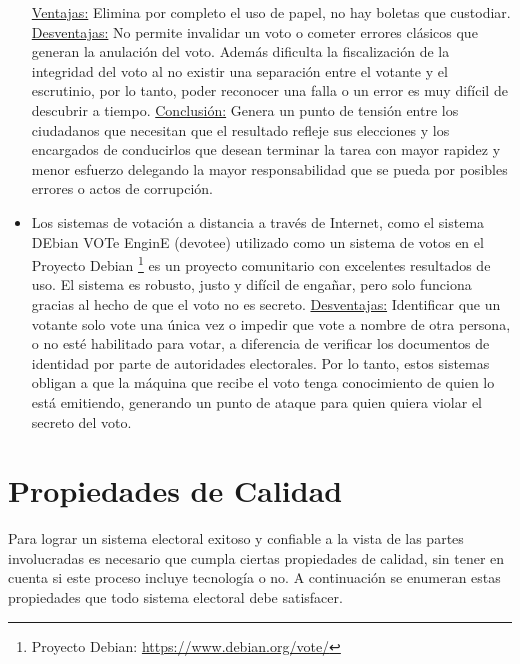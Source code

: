 \begin{itemize}
    \underline{Ventajas:} Elimina por completo el uso de papel, no hay boletas que custodiar.\newline
    \underline{Desventajas:} No permite invalidar un voto o cometer errores clásicos que generan la anulación del voto. Además dificulta la fiscalización de la integridad del voto al no existir una separación entre el votante y el escrutinio, por lo tanto, poder reconocer una falla o un error es muy difícil de descubrir a tiempo. \newline
    \underline{Conclusión:} Genera un punto de tensión entre los ciudadanos que necesitan que el resultado refleje sus elecciones y los encargados de conducirlos que desean terminar la tarea con mayor rapidez y menor esfuerzo delegando la mayor responsabilidad que se pueda por posibles errores o actos de corrupción.
    \item Los sistemas de votación a distancia a través de Internet, como el sistema DEbian VOTe EnginE (devotee) utilizado como un sistema de votos en el Proyecto Debian \footnote{Proyecto Debian: \url{https://www.debian.org/vote/}} es un proyecto comunitario con excelentes resultados de uso. El sistema es robusto, justo y difícil de engañar, pero solo funciona gracias al hecho de que el voto no es secreto.\newline
    \underline{Desventajas:} Identificar que un votante solo vote una única vez o impedir que vote a nombre de otra persona, o no esté habilitado para votar, a diferencia de verificar los documentos de identidad por parte de autoridades electorales. Por lo tanto, estos sistemas obligan a que la máquina que recibe el voto tenga conocimiento de quien lo está emitiendo, generando un punto de ataque para quien quiera violar el secreto del voto.
\end{itemize}


\section{Propiedades de Calidad}
Para lograr un sistema electoral exitoso y confiable a la vista de las partes involucradas es necesario que cumpla ciertas propiedades de calidad, sin tener en cuenta si este proceso incluye tecnología o no. A continuación se enumeran estas propiedades que todo sistema electoral debe satisfacer.


